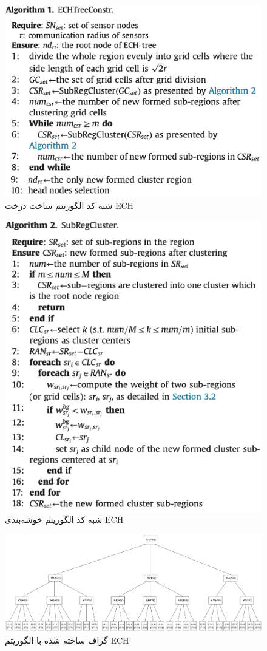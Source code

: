 \begin{figure}
	\centering
	\includegraphics[width=0.7\linewidth]{figs/ech-al1}
	\caption {شبه کد الگوریتم ساخت درخت ECH}
	\label{fig:ech-al1}
\end{figure}

\begin{figure}
	\centering
	\includegraphics[width=0.7\linewidth]{figs/ech-al2}
	\caption {شبه کد الگوریتم خوشه‌بندی ECH}
	\label{fig:ech-al2}
\end{figure}

\begin{figure}
	\centering
	\includegraphics[width=0.7\paperheight,angle=90,origin=c]{figs/ech-graph}
	\caption {گراف ساخته شده با الگوریتم ECH}
	\label{fig:ech-graph}
\end{figure}

